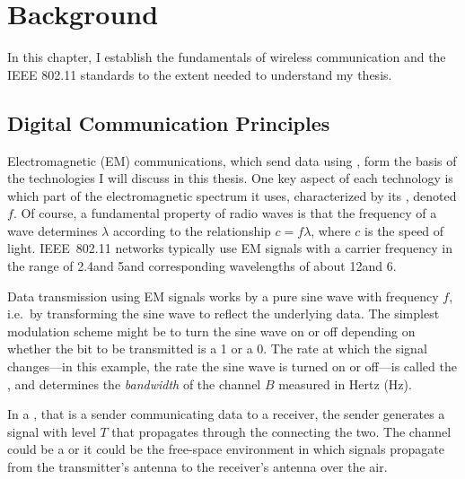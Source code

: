 \ifx\mainfile\undefined

\setcounter{chapter}{1} %
\fi

\cleardoublepage
\chapter{Background}
\label{chap:background}

In this chapter, I establish the fundamentals of wireless communication and the IEEE 802.11 standards to the extent needed to understand my thesis.

\section{Digital Communication Principles}
Electromagnetic (EM) communications, which send data using , form the basis of the technologies I will discuss in this thesis. One key aspect of each technology is which part of the electromagnetic spectrum it uses, characterized by its , denoted $f$. Of course, a fundamental property of radio waves is that the frequency of a wave determines  $\lambda$ according to the relationship $c=f\lambda$, where $c$ is the speed of light. IEEE~802.11 networks typically use EM signals with a carrier frequency in the range of 2.4\GHz and 5\GHz and corresponding wavelengths of about 12\cm and 6\cm.

Data transmission using EM signals works by  a pure sine wave with frequency $f$, i.e.\ by transforming the sine wave to reflect the underlying data. The simplest modulation scheme might be to turn the sine wave on or off depending on whether the bit to be transmitted is a 1 or a 0. The rate at which the signal changes---in this example, the rate the sine wave is turned on or off---is called the , and determines the \emph{bandwidth} of the channel $B$ measured in Hertz (Hz).

In a , that is a sender communicating data to a receiver, the sender generates a signal with  level $T$ that propagates through the  connecting the two. The channel could be a  or it could be the free-space  environment in which signals propagate from the transmitter's antenna to the receiver's antenna over the air.

